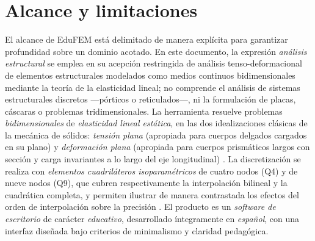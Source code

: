 \section*{Alcance y limitaciones}

El alcance de EduFEM está delimitado de manera explícita para garantizar profundidad sobre un dominio acotado. En este documento, la expresión \emph{análisis estructural} se emplea en su acepción restringida de análisis tenso-deformacional de elementos estructurales modelados como medios continuos bidimensionales mediante la teoría de la elasticidad lineal; no comprende el análisis de sistemas estructurales discretos —pórticos o reticulados—, ni la formulación de placas, cáscaras o problemas tridimensionales. La herramienta resuelve problemas \emph{bidimensionales} de \emph{elasticidad lineal estática}, en las dos idealizaciones clásicas de la mecánica de sólidos: \emph{tensión plana} (apropiada para cuerpos delgados cargados en su plano) y \emph{deformación plana} (apropiada para cuerpos prismáticos largos con sección y carga invariantes a lo largo del eje longitudinal) \autocite[p.~11]{timoshenko1970elasticity}. La discretización se realiza con \emph{elementos cuadriláteros isoparamétricos} de cuatro nodos (Q4) y de nueve nodos (Q9), que cubren respectivamente la interpolación bilineal y la cuadrática completa, y permiten ilustrar de manera contrastada los efectos del orden de interpolación sobre la precisión \autocites[pp.~137-138]{hughes2000fem}[pp.~164, 183-184]{onate2009structural}. El producto es un \emph{software de escritorio} de carácter \emph{educativo}, desarrollado íntegramente en \emph{español}, con una interfaz diseñada bajo criterios de minimalismo y claridad pedagógica.

